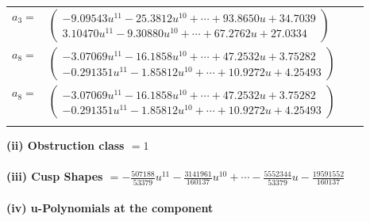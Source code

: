\documentclass[1p]{elsarticle_modified}
\theoremstyle{definition}
\begin{document}
\begin{tabular}{m{7pt} m{180pt} m{7pt} m{180pt} }
\flushright $a_{3}=$&$\begin{pmatrix}-9.09543 u^{11}-25.3812 u^{10}+\cdots+93.8650 u+34.7039\\3.10470 u^{11}-9.30880 u^{10}+\cdots+67.2762 u+27.0334\end{pmatrix}$ \\
\flushright $a_{8}=$&$\begin{pmatrix}-3.07069 u^{11}-16.1858 u^{10}+\cdots+47.2532 u+3.75282\\-0.291351 u^{11}-1.85812 u^{10}+\cdots+10.9272 u+4.25493\end{pmatrix}$\\ \flushright $a_{8}=$&$\begin{pmatrix}-3.07069 u^{11}-16.1858 u^{10}+\cdots+47.2532 u+3.75282\\-0.291351 u^{11}-1.85812 u^{10}+\cdots+10.9272 u+4.25493\end{pmatrix}$\\&\end{tabular}
\flushleft \textbf{(ii) Obstruction class $= 1$}\\~\\
\flushleft \textbf{(iii) Cusp Shapes $= -\frac{507188}{53379} u^{11}-\frac{3141961}{160137} u^{10}+\cdots-\frac{5552344}{53379} u-\frac{19591552}{160137}$}\\~\\
\newpage\renewcommand{\arraystretch}{1}
\flushleft \textbf{(iv) u-Polynomials at the component}\newline \\
\end{document}
